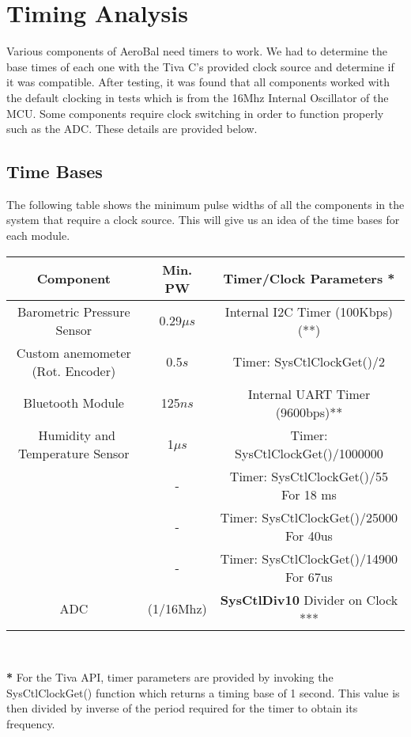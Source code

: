 \section{Timing Analysis}

	Various components of AeroBal need timers to work. We had to determine the base times of each one with the Tiva C's provided clock source and determine if it was compatible. After testing, it was found that all components worked with the default clocking in tests which is from the 16Mhz Internal Oscillator of the MCU. Some components require clock switching in order to function properly such as the ADC. These details are provided below.
	
	\subsection{Time Bases}
	
	The following table shows the minimum pulse widths of all the components in the system that require a clock source. This will give us an idea of the time bases for each module. 
	
	\begin{center}	
	\begin{tabular}{|c|c|c|}
			\hline
				Component 							& Min. PW & Timer/Clock Parameters *\\
			\hline
				Barometric Pressure Sensor 			& 0.29$\mu s$	& Internal I2C Timer (100Kbps) (**)\\
				Custom anemometer (Rot. Encoder)	& 0.5$s$  		& Timer: SysCtlClockGet()/2 \\
				Bluetooth Module 					& 125$ns$ 		& Internal UART Timer (9600bps)**\\\
				Humidity and Temperature Sensor 	& 1$\mu s$		& Timer: SysCtlClockGet()/1000000\\
													& - 			& Timer: SysCtlClockGet()/55 For 18 ms\\
													& - 			& Timer: SysCtlClockGet()/25000 For 40us\\
													& - 			& Timer: SysCtlClockGet()/14900 For 67us\\
				ADC & (1/16Mhz) & \textbf{SysCtlDiv10} Divider on Clock ***\\
			\hline
		\end{tabular} \\
	\end{center}
	
	\textbf{*} For the Tiva API, timer parameters are provided by invoking the SysCtlClockGet() function which returns a timing base of 1 second. This value is then divided by inverse of the period required for the timer to obtain its frequency.

